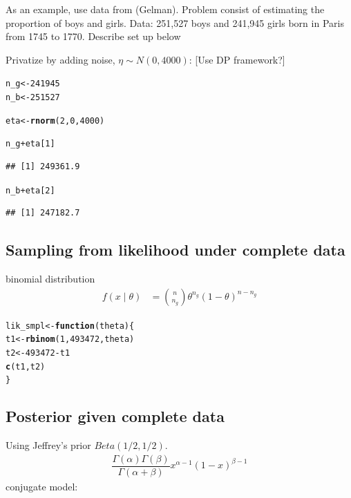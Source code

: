 \documentclass{article}\usepackage[]{graphicx}\usepackage[]{xcolor}
\makeatletter
\newcommand{\hlnum}[1]{\textcolor[rgb]{0.686,0.059,0.569}{#1}}%
\newcommand{\hlopt}[1]{\textcolor[rgb]{0,0,0}{#1}}%
\newcommand{\hlstd}[1]{\textcolor[rgb]{0.345,0.345,0.345}{#1}}%
\newcommand{\hlkwa}[1]{\textcolor[rgb]{0.161,0.373,0.58}{\textbf{#1}}}%
\newcommand{\hlkwb}[1]{\textcolor[rgb]{0.69,0.353,0.396}{#1}}%
\newcommand{\hlkwc}[1]{\textcolor[rgb]{0.333,0.667,0.333}{#1}}%
\newcommand{\hlkwd}[1]{\textcolor[rgb]{0.737,0.353,0.396}{\textbf{#1}}}%
\newenvironment{kframe}{%
 \def\at@end@of@kframe{}%
 \ifinner\ifhmode%
  \def\at@end@of@kframe{\end{minipage}}%
  \begin{minipage}{\columnwidth}%
 \fi\fi%
 \def\FrameCommand##1{\hskip\@totalleftmargin \hskip-\fboxsep
 \colorbox{shadecolor}{##1}\hskip-\fboxsep
     \hskip-\linewidth \hskip-\@totalleftmargin \hskip\columnwidth}%
 \MakeFramed {\advance\hsize-\width
   \@totalleftmargin\z@ \linewidth\hsize
   \@setminipage}}%
 {\par\unskip\endMakeFramed%
 \at@end@of@kframe}
\newenvironment{knitrout}{}{} %
\theoremstyle{definition}
\makeatother
\begin{document}
As an example, use data from (Gelman). Problem
consist of estimating the proportion of boys and girls.
Data: 251,527 boys and 241,945 girls born in Paris
from 1745 to 1770. Describe set up below

Privatize by adding noise, $\eta \sim N(0, 4000)$:
[Use DP framework?]
\begin{knitrout}
\color{fgcolor}\begin{kframe}
\begin{alltt}
\hlstd{n_g} \hlkwb{<-} \hlnum{241945}
\hlstd{n_b} \hlkwb{<-} \hlnum{251527}

\hlstd{eta} \hlkwb{<-} \hlkwd{rnorm}\hlstd{(}\hlnum{2}\hlstd{,}\hlnum{0}\hlstd{,}\hlnum{4000}\hlstd{)}

\hlstd{n_g} \hlopt{+} \hlstd{eta[}\hlnum{1}\hlstd{]}
\end{alltt}
\begin{verbatim}
## [1] 249361.9
\end{verbatim}
\begin{alltt}
\hlstd{n_b} \hlopt{+} \hlstd{eta[}\hlnum{2}\hlstd{]}
\end{alltt}
\begin{verbatim}
## [1] 247182.7
\end{verbatim}
\end{kframe}
\end{knitrout}

\subsection*{Sampling from likelihood under complete data}
binomial distribution
\begin{align*}
f(x \mid \theta) &= \binom{n}{n_g} \theta^{n_g}(1-\theta)^{n-n_g}
\end{align*}

\begin{knitrout}
\color{fgcolor}\begin{kframe}
\begin{alltt}
\hlstd{lik_smpl} \hlkwb{<-} \hlkwa{function}\hlstd{(}\hlkwc{theta}\hlstd{) \{}
  \hlstd{t1} \hlkwb{<-} \hlkwd{rbinom}\hlstd{(}\hlnum{1}\hlstd{,} \hlnum{493472}\hlstd{, theta)}
  \hlstd{t2} \hlkwb{<-} \hlnum{493472} \hlopt{-} \hlstd{t1}
  \hlkwd{c}\hlstd{(t1,t2)}
\hlstd{\}}
\end{alltt}
\end{kframe}
\end{knitrout}

\subsection*{Posterior given complete data}
Using Jeffrey's prior $Beta(1/2,1/2)$.
\begin{align*}
\dfrac{\Gamma(\alpha)\Gamma(\beta)}{\Gamma(\alpha + \beta)}x^{\alpha -1}(1-x)^{\beta-1}
\end{align*}
conjugate model:




\nocite{*}


\end{document}
